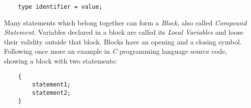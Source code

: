 \begin{scriptsize}
    \begin{verbatim}
    type identifier = value;
    \end{verbatim}
\end{scriptsize}

Many statements which belong together can form a \emph{Block}, also called
\emph{Compound Statement}. Variables declared in a block are called its
\emph{Local Variables} and loose their validity outside that block. Blocks have
an opening and a closing symbol. Following once more an example in \emph{C}
programming language source code, showing a block with two statements:

\begin{scriptsize}
    \begin{verbatim}
    {
        statement1;
        statement2;
    }
    \end{verbatim}
\end{scriptsize}
